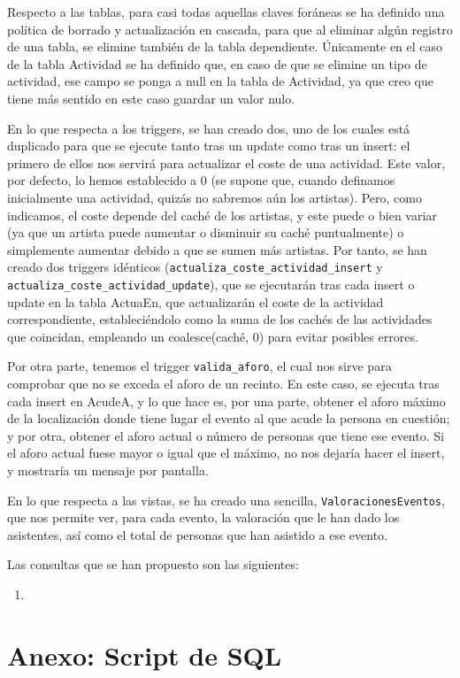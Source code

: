 \documentclass[a4paper,onecolumn]{article}
\let\stdsection\section
\renewcommand\section{\newpage\stdsection}
\begin{document}
\begin{sloppypar}
Respecto a las tablas, para casi todas aquellas claves foráneas se ha definido una política de borrado y actualización en cascada, para que al eliminar 
algún registro de una tabla, se elimine también de la tabla dependiente. Únicamente en el caso de la tabla Actividad se ha definido que, en caso de que 
se elimine un tipo de actividad, ese campo se ponga a null en la tabla de Actividad, ya que creo que tiene más sentido en este caso guardar un valor nulo.

En lo que respecta a los triggers, se han creado dos, uno de los cuales está duplicado para que se ejecute tanto tras un update como tras un insert: 
el primero de ellos nos servirá para actualizar el coste de una actividad. Este valor, por defecto, lo hemos establecido a 0 (se supone que, cuando 
definamos inicialmente una actividad, quizás no sabremos aún los artistas). Pero, como indicamos, el coste depende del caché de los artistas, y este 
puede o bien variar (ya que un artista puede aumentar o disminuir su caché puntualmente) o simplemente aumentar debido a que se sumen más artistas. Por tanto,
se han creado dos triggers idénticos (\texttt{actualiza\_coste\_actividad\_insert} y \texttt{actualiza\_coste\_actividad\_update}), que se ejecutarán tras cada 
insert o update en la tabla ActuaEn, que actualizarán el coste de la actividad correspondiente, estableciéndolo como la suma de los cachés de las actividades 
que coincidan, empleando un coalesce(caché, 0) para evitar posibles errores. 

Por otra parte, tenemos el trigger \texttt{valida\_aforo}, el cual nos sirve para comprobar que no se exceda el aforo de un recinto. En este caso, se 
ejecuta tras cada insert en AcudeA, y lo que hace es, por una parte, obtener el aforo máximo de la localización donde tiene lugar el evento al que acude la 
persona en cuestión; y por otra, obtener el aforo actual o número de personas que tiene ese evento. Si el aforo actual fuese mayor o igual que el máximo, 
no nos dejaría hacer el insert, y mostraría un mensaje por pantalla.

En lo que respecta a las vistas, se ha creado una sencilla, \texttt{ValoracionesEventos}, que nos permite ver, para cada evento, la valoración que le han 
dado los asistentes, así como el total de personas que han asistido a ese evento.

Las consultas que se han propuesto son las siguientes:
\begin{enumerate}
    \item 
\end{enumerate}

\newpage

\appendix
\section{Anexo: Script de SQL}\label{anexo1}


\end{sloppypar}
\end{document}
